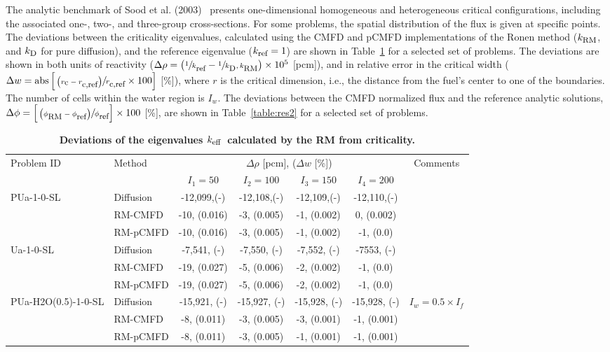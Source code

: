 \documentclass[letterpaper]{mc2021}
\newcommand{\keff}{\ensuremath{k_{\textrm{\scriptsize{eff}}}}}
\newcommand{\kref}{\ensuremath{k_{\textrm{\scriptsize{ref}}}}}
\newcommand{\kd}{\ensuremath{k_{\textrm{\scriptsize{D}}}}}
\newcommand{\krm}{\ensuremath{k_{\textrm{\scriptsize{RM}}}}}
\newcommand{\rcref}{\ensuremath{r_{\textrm{\scriptsize{c,ref}}}}}
\newcommand{\rc}{\ensuremath{r_{\textrm{\scriptsize{c}}}}}
\newcommand{\phiref}{\ensuremath{\phi_{\textrm{\scriptsize{ref}}}}}
\newcommand{\phirm}{\ensuremath{\phi_{\textrm{\scriptsize{RM}}}}}
\begin{document}
The analytic benchmark of Sood et al. (2003)~\cite{Sood2003} presents one-dimensional homogeneous and heterogeneous critical configurations, including the associated one-, two-, and three-group cross-sections. For some problems, the spatial distribution of the flux is given at specific points. 
%
The deviations between the criticality eigenvalues, calculated using the CMFD and pCMFD implementations of the Ronen method ($\krm$, and $\kd$ for pure diffusion), and the reference eigenvalue ($\kref=1$) are shown in Table~\ref{table:res1} for a selected set of problems. The deviations are shown in both units of reactivity ($\Delta\rho = \left(\sfrac{1}{\kref}- \sfrac{1}{\kd,\krm}\right)\times 10^5$ [pcm]), and in relative error in the critical width ($\Delta w = \text{abs}\left[ \sfrac{ \left( \rc-\rcref\right)}{\rcref}\times 100\right]$ [\%]), where $r$ is the critical dimension, i.e., the distance from the fuel's center to one of the boundaries. The number of cells within the water region is $I_w$.
%
The deviations between the CMFD normalized flux and the reference analytic solutions,  $\Delta\phi = \left[\sfrac{\left(\phirm - \phiref\right)}{\phiref}\right]\times 100$ [\%], are shown in Table~\ref{table:res2} for a selected set of problems. 
%
\begin{table}[!htb]
	\vspace{-7.5mm}	
	\centering
	\small
	\caption{\bf Deviations of the eigenvalues \keff \ calculated by the RM from criticality.}
	\label{table:res1} 
  \begin{tabular}{|l|l|c|c|c|c|c|} \hline 
	\multirow{2}{*}{Problem ID} & \multirow{2}{*}{Method} & \multicolumn{4}{c|}{$\Delta\rho$ [pcm], ($\Delta w$ [\%])} & \multirow{2}{*}{Comments} \\ 
	\cline{3-6}
	&  	 & $I_1 = 50$   & $I_2 = 100$ & $I_3 = 150$ & $I_4 = 200$    & \\ 
	\hline
	\multirow{3}{*}{PUa-1-0-SL} 		 & Diffusion  & -12,099,(-)  & -12,108,(-) & -12,109,(-) &-12,110,(-)   & \multirow{2}{*}{}\\ 
	\cline{2-6}
	& RM-CMFD  & -10, (0.016) & -3, (0.005) & -1, (0.002) & 0, (0.002)      & \multirow{2}{*}{}\\ 
	\cline{2-6}
	& RM-pCMFD & -10, (0.016) & -3, (0.005) & -1, (0.002) & -1, (0.0) & \\ 
	\hline
	\multirow{3}{*}{Ua-1-0-SL} 		     & Diffusion  & -7,541, (-)  & -7,550, (-) & -7,552, (-)  & -7553, (-)  & \multirow{2}{*}{}\\ 
	\cline{2-6}
	& RM-CMFD  & -19, (0.027)  & -5, (0.006) & -2, (0.002)  & -1, (0.0)  & \multirow{2}{*}{}\\ 
	\cline{2-6}
	& RM-pCMFD & -19, (0.027)  & -5, (0.006) & -2, (0.002)  & -1, (0.0)	  & \\ 
	\hline
	\multirow{2}{*}{PUa-H2O(0.5)-1-0-SL} & Diffusion  & -15,921, (-) & -15,927, (-) & -15,928, (-) & -15,928, (-) & \multirow{2}{*}{$I_w = 0.5\times I_f$} \\ 
	\cline{2-6}
	& RM-CMFD  & -8, (0.011)  & -3, (0.005) & -3, (0.001)	& -1, (0.001) &  \\ 
	\cline{2-6}
	& RM-pCMFD &-8, (0.011)	& -3, (0.005) & -1, (0.001)	& -1, (0.001) & \\ 
	\hline
\end{tabular}
\end{table}
\end{document}
